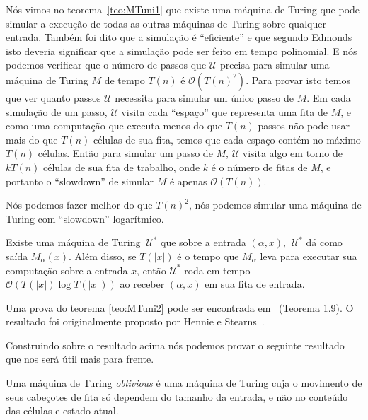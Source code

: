 Nós vimos no teorema~\ref{teo:MTuni1} que existe uma máquina de Turing que pode simular a execução de todas as outras máquinas de Turing sobre qualquer entrada. Também foi dito que a simulação é ``eficiente'' e que segundo Edmonds isto deveria significar que a simulação pode ser feito em tempo polinomial. E nós podemos verificar que o número de passos que $\mathcal{U}$ precisa para simular uma máquina de Turing $M$ de tempo $T(n)$ é $\mathcal{O}(T(n)^{2})$. Para provar isto temos que ver quanto passos $\mathcal{U}$ necessita para simular um único passo de $M$. Em cada simulação de um passo, $\mathcal{U}$ visita cada ``espaço'' que representa uma fita de $M$, e como uma computação que executa menos do que $T(n)$ passos não pode usar mais do que $T(n)$ células de sua fita, temos que cada espaço contém no máximo $T(n)$ células. Então para simular um passo de $M$, $\mathcal{U}$ visita algo em torno de $kT(n)$ células de sua fita de trabalho, onde $k$ é o número de fitas de $M$, e portanto o ``slowdown'' de simular $M$ é apenas $\mathcal{O}(T(n))$.

Nós podemos fazer melhor do que $T(n)^{2}$, nós podemos simular uma máquina de Turing com ``slowdown'' logarítmico.

\begin{teo} \label{teo:MTuni2}

Existe uma máquina de Turing $~\mathcal{U}^{*}$ que sobre a entrada $(\alpha, x)$, $~\mathcal{U}^{*}$ dá como saída $M_{\alpha}(x)$. Além disso, se $T(\lvert x \rvert)$ é o tempo que $M_{\alpha}$ leva para executar sua computação sobre a entrada $x$, então $\mathcal{U}^{*}$ roda em tempo $\mathcal{O}(T(\lvert x \rvert)\log T(\lvert x \rvert))$ ao receber $(\alpha, x)$ em sua fita de entrada.

\end{teo}

Uma prova do teorema \ref{teo:MTuni2} pode ser encontrada em~\cite{arora2009computational} (Teorema 1.9). O resultado foi originalmente proposto por Hennie e Stearns~\cite{hennie1966two}.


Construindo sobre o resultado acima nós podemos provar o seguinte resultado que nos será útil mais para frente.

\begin{defi} \label{defi: oblivious}

Uma máquina de Turing \emph{oblivious} é uma máquina de Turing cuja o movimento de seus cabeçotes de fita só dependem do tamanho da entrada, e não no conteúdo das células e estado atual.

\end{defi}

